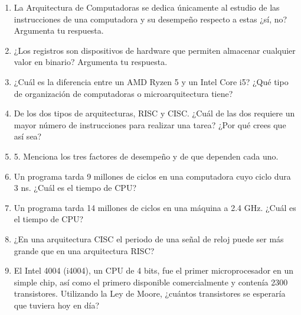\documentclass[a4paper,12pt]{article}
\begin{document}
\begin{enumerate}
        \item La Arquitectura de Computadoras se dedica  únicamente al estudio de las instrucciones de una computadora y su desempeño respecto a estas ¿sí, no? Argumenta tu respuesta.
        \item ¿Los registros son dispositivos de hardware que permiten almacenar cualquier valor en binario? Argumenta tu respuesta.
        \item ¿Cuál es la diferencia entre un AMD Ryzen 5 y un Intel Core i5? ¿Qué tipo de organización de computadoras o microarquitectura tiene?
        \item De los dos tipos de arquitecturas, RISC y CISC. ¿Cuál de las dos requiere un mayor número de instrucciones para realizar una tarea? ¿Por qué crees que así sea?
        \item 5. Menciona los tres factores de desempeño y de que dependen cada uno.
        \item Un programa tarda 9 millones de ciclos en una computadora cuyo ciclo dura 3 ns. ¿Cuál es el tiempo de CPU?
        \item Un programa tarda 14 millones de ciclos en una máquina a 2.4 GHz. ¿Cuál es el tiempo de CPU?
        \item ¿En una arquitectura CISC el periodo de una señal de reloj puede ser más grande que en una  arquitectura RISC?
        \item El Intel 4004 (i4004), un CPU de 4 bits, fue el primer microprocesador en un simple chip, así como el primero disponible comercialmente y contenía 2300 transistores. Utilizando la Ley de Moore, ¿cuántos transistores se esperaría que tuviera hoy en día?      %
%



            
    
\end{enumerate}


\nocite{*}
\printbibliography
\end{document}
